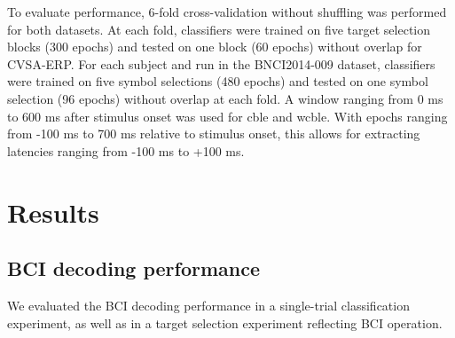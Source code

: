 To evaluate performance, 6-fold cross-validation without shuffling was performed for both
datasets.
At each fold, classifiers were trained on five target selection blocks (300
epochs) and tested on one block (60 epochs) without overlap for CVSA-ERP.
For each subject and run in the BNCI2014-009 dataset, classifiers
were trained on five symbol selections (480 epochs) and tested on one symbol
selection (96 epochs) without overlap at each fold.
A window ranging from 0 ms to 600 ms after stimulus onset was used for \ac{cble} and \ac{wcble}.
With epochs ranging from -100 ms to 700 ms relative to stimulus onset, this
allows for extracting latencies ranging from -100 ms to +100 ms.


\section{Results}

\subsection{BCI decoding performance}
\label{sec:block_accuracy}

We evaluated the BCI decoding performance in a single-trial classification
experiment, as well as in a target selection experiment reflecting BCI
operation.

